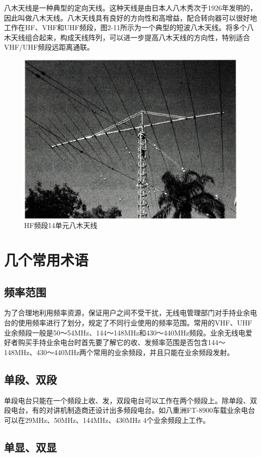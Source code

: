 \documentclass[12pt,UTF8]{ctexbook}
\begin{document}
八木天线是一种典型的定向天线。这种天线是由日本人八木秀次于1926年发明的，因此叫做八木天线。八木天线具有良好的方向性和高增益，配合转向器可以很好地工作在HF、VHF和UHF频段，图2-11所示为一个典型的短波八木天线。将多个八木天线组合起来，构成天线阵列，可以进一步提高八木天线的方向性，特别适合VHF/UHF频段远距离通联。

\begin{figure}[htbp]
	\centering
	\includegraphics[width=0.7\linewidth]{28}
	\caption{HF频段14单元八木天线}
	\label{fig:1}
\end{figure}

\section{几个常用术语}

\subsection{频率范围}

为了合理地利用频率资源，保证用户之间不受干扰，无线电管理部门对手持业余电台的使用频率进行了划分，规定了不同行业使用的频率范围。常用的VHF、UHF业余频段一般是50～54MHz、144～148MHz和430～440MHz频段。业余无线电爱好者购买手持业余电台时首先要了解它的收、发频率范围是否包含144～148MHz、430～440MHz两个常用的业余频段，并且只能在业余频段发射。

\subsection{单段、双段}

单段电台只能在一个频段上收、发，双段电台可以工作在两个频段上。除单段、双段电台，有的对讲机制造商还设计出多频段电台。如八重洲FT-8900车载业余电台可以在29MHz、50MHz、144MHz、430MHz 4个业余频段上工作。

\subsection{单显、双显}
\end{document}
